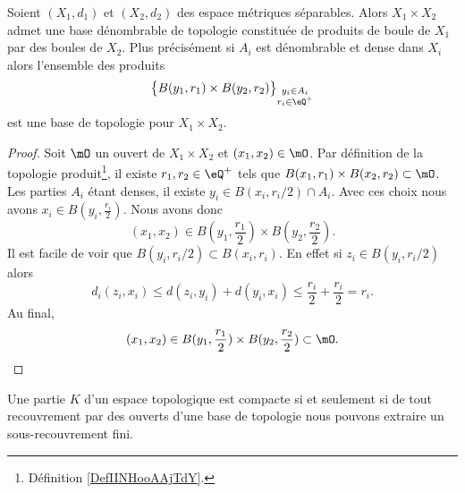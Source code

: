 \begin{lemma}   \label{LemDUJXooWsnmpL}
    Soient \( (X_1,d_1)\) et \( (X_2,d_2)\) des espace métriques séparables. Alors \( X_1\times X_2\) admet une base dénombrable de topologie constituée de produits de boule de \( X_1\) par des boules de \( X_2\). Plus précisément si $A_i$ est dénombrable et dense dans \( X_i\) alors l'ensemble des produits
    \begin{equation}
        \big\{ B(y_1,r_1)\times B(y_2,r_2)\big\}_{\substack{y_i\in A_i\\r_i\in \eQ^+}}
    \end{equation}
    est une base de topologie pour \( X_1\times X_2\).
\end{lemma}

\begin{proof}
    Soit \( \mO\) un ouvert de \( X_1\times X_2\) et \( (x_1,x_2)\in \mO\). Par définition de la topologie produit\footnote{Définition \ref{DefIINHooAAjTdY}.}, il existe \( r_1,r_2\in \eQ^+\) tels que \( B(x_1,r_1)\times B(x_2,r_2)\subset\mO\). Les parties \( A_i\) étant denses, il existe \( y_i\in B(x_i,r_i/2)\cap A_i\). Avec ces choix nous avons $x_i\in B(y_i,\frac{ r_i }{2})$. Nous avons donc
    \begin{equation}
        (x_1,x_2)\in B(y_1,\frac{ r_1 }{ 2 })\times B(y_2,\frac{ r_2 }{2}).
    \end{equation}
    Il est facile de voir que \( B(y_i,r_i/2)\subset B(x_i,r_i)\). En effet si \( z_i\in B(y_i,r_i/2)\) alors
    \begin{equation}
        d_i(z_i,x_i)\leq d(z_i,y_i)+d(y_i,x_i)\leq \frac{ r_i }{2}+\frac{ r_i }{2}=r_i.
    \end{equation}
    Au final,
    \begin{equation}
        (x_1,x_2)\in B(y_1,\frac{ r_1 }{ 2 })\times B(y_2,\frac{ r_2 }{2})\subset \mO.
    \end{equation}
\end{proof}

\begin{lemma}   \label{LemOWVooZKndbI}
    Une partie \( K\) d'un espace topologique est compacte si et seulement si de tout recouvrement par des ouverts d'une base de topologie nous pouvons extraire un sous-recouvrement fini.
\end{lemma}

